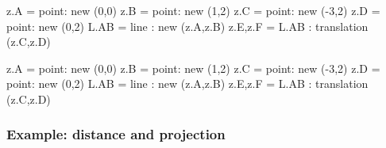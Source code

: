 \begin{minipage}{0.6\textwidth}
\begin{tkzexample}
\begin{tkzelements}
   z.A  = point:  new (0,0)
   z.B  = point:  new (1,2)
   z.C  = point:  new (-3,2)
   z.D  = point:  new (0,2)
   L.AB = line : new (z.A,z.B)
   z.E,z.F = L.AB : translation (z.C,z.D)
\end{tkzelements}
\end{tkzexample}
\end{minipage}
\begin{minipage}{0.4\textwidth}
\begin{tkzelements}
   z.A  = point:  new (0,0)
   z.B  = point:  new (1,2)
   z.C  = point:  new (-3,2)
   z.D  = point:  new (0,2)
   L.AB = line : new (z.A,z.B)
   z.E,z.F = L.AB : translation (z.C,z.D)
\end{tkzelements}
\hspace*{\fill}
\hspace*{\fill}
\end{minipage}


\subsubsection{Example: distance and projection} %
\label{ssub:example_distance_and_projection}

